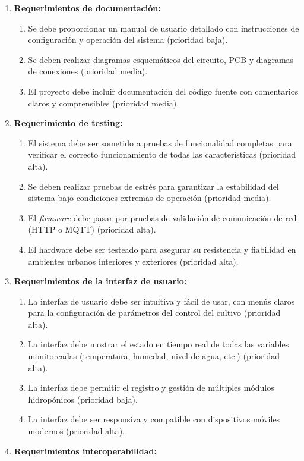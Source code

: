 \documentclass[
11pt, %
]{charter}
\begin{document}
\begin{enumerate}
\begin{enumerate}
		\end{enumerate}
	\item \textbf{Requerimientos de documentación:}
		\begin{enumerate}
			\item Se debe proporcionar un manual de usuario detallado con instrucciones de configuración y operación del sistema (prioridad baja).
			\item Se deben realizar diagramas esquemáticos del circuito, PCB y diagramas de conexiones (prioridad media).
			\item El proyecto debe incluir documentación del código fuente con comentarios claros y comprensibles (prioridad media).
		\end{enumerate}
	\item \textbf{Requerimiento de testing:}
	\begin{enumerate}
	\item El sistema debe ser sometido a pruebas de funcionalidad completas para verificar el correcto funcionamiento de todas las características (prioridad alta).
	\item Se deben realizar pruebas de estrés para garantizar la estabilidad del sistema bajo condiciones extremas de operación (prioridad media).
	\item El \textit{firmware} debe pasar por pruebas de validación de comunicación de red (HTTP o MQTT) (prioridad alta).
	\item El hardware debe ser testeado para asegurar su resistencia y fiabilidad en ambientes urbanos interiores y exteriores (prioridad alta).
	\end{enumerate}
	\item \textbf{Requerimientos de la interfaz de usuario:}
	\begin{enumerate}
	\item La interfaz de usuario debe ser intuitiva y fácil de usar, con menús claros para la configuración de parámetros del control del cultivo (prioridad alta).
	\item La interfaz debe mostrar el estado en tiempo real de todas las variables monitoreadas (temperatura, humedad, nivel de agua, etc.) (prioridad alta).
	\item La interfaz debe permitir el registro y gestión de múltiples módulos hidropónicos (prioridad baja).
	\item La interfaz debe ser responsiva y compatible con dispositivos móviles modernos (prioridad alta).
	\end{enumerate}
	\item \textbf{Requerimientos interoperabilidad:}

\end{enumerate}
\end{document}
